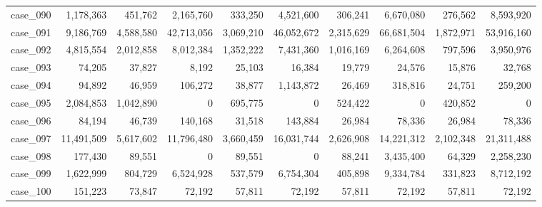 \begin{footnotesize}
\begin{longtable}{l r rr rr rr rr}
case\_090 & 1{,}178{,}363 & 451{,}762 & 2{,}165{,}760 & 333{,}250 & 4{,}521{,}600 & 306{,}241 & 6{,}670{,}080 & 276{,}562 & 8{,}593{,}920 \\
case\_091 & 9{,}186{,}769 & 4{,}588{,}580 & 42{,}713{,}056 & 3{,}069{,}210 & 46{,}052{,}672 & 2{,}315{,}629 & 66{,}681{,}504 & 1{,}872{,}971 & 53{,}916{,}160 \\
case\_092 & 4{,}815{,}554 & 2{,}012{,}858 & 8{,}012{,}384 & 1{,}352{,}222 & 7{,}431{,}360 & 1{,}016{,}169 & 6{,}264{,}608 & 797{,}596 & 3{,}950{,}976 \\
case\_093 & 74{,}205 & 37{,}827 & 8{,}192 & 25{,}103 & 16{,}384 & 19{,}779 & 24{,}576 & 15{,}876 & 32{,}768 \\
case\_094 & 94{,}892 & 46{,}959 & 106{,}272 & 38{,}877 & 1{,}143{,}872 & 26{,}469 & 318{,}816 & 24{,}751 & 259{,}200 \\
case\_095 & 2{,}084{,}853 & 1{,}042{,}890 & 0 & 695{,}775 & 0 & 524{,}422 & 0 & 420{,}852 & 0 \\
case\_096 & 84{,}194 & 46{,}739 & 140{,}168 & 31{,}518 & 143{,}884 & 26{,}984 & 78{,}336 & 26{,}984 & 78{,}336 \\
case\_097 & 11{,}491{,}509 & 5{,}617{,}602 & 11{,}796{,}480 & 3{,}660{,}459 & 16{,}031{,}744 & 2{,}626{,}908 & 14{,}221{,}312 & 2{,}102{,}348 & 21{,}311{,}488 \\
case\_098 & 177{,}430 & 89{,}551 & 0 & 89{,}551 & 0 & 88{,}241 & 3{,}435{,}400 & 64{,}329 & 2{,}258{,}230 \\
case\_099 & 1{,}622{,}999 & 804{,}729 & 6{,}524{,}928 & 537{,}579 & 6{,}754{,}304 & 405{,}898 & 9{,}334{,}784 & 331{,}823 & 8{,}712{,}192 \\
case\_100 & 151{,}223 & 73{,}847 & 72{,}192 & 57{,}811 & 72{,}192 & 57{,}811 & 72{,}192 & 57{,}811 & 72{,}192 \\
\end{longtable}
\end{footnotesize}
